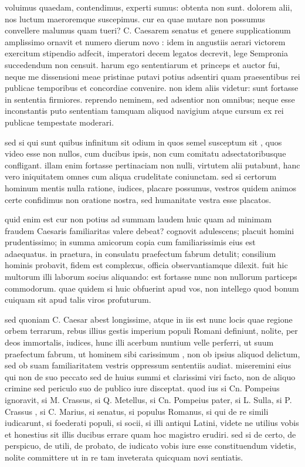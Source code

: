  voluimus quaedam, contendimus, experti sumus: obtenta non sunt. dolorem alii, nos luctum maeroremque suscepimus. cur ea quae mutare non possumus convellere malumus quam tueri? C. Caesarem senatus et genere supplicationum amplissimo ornavit et numero dierum novo : idem in angustiis aerari victorem exercitum stipendio adfecit, imperatori decem legatos decrevit, lege Sempronia succedendum non censuit. harum ego sententiarum et princeps et auctor fui, neque me dissensioni meae pristinae putavi potius adsentiri quam praesentibus rei publicae temporibus et concordiae convenire. non idem aliis videtur: sunt fortasse in sententia firmiores. reprendo neminem, sed adsentior non omnibus; neque esse inconstantis puto sententiam tamquam aliquod navigium atque cursum ex rei publicae tempestate moderari.

 sed si qui sunt quibus infinitum sit odium in quos semel susceptum sit , quos video esse non nullos, cum ducibus ipsis, non cum comitatu adsectatoribusque confligant. illam enim fortasse pertinaciam non nulli, virtutem alii putabunt, hanc vero iniquitatem omnes cum aliqua crudelitate coniunctam. sed si certorum hominum mentis nulla ratione, iudices, placare possumus, vestros quidem animos certe confidimus non oratione nostra, sed humanitate vestra esse placatos.

 quid enim est cur non potius ad summam laudem huic quam ad minimam fraudem Caesaris familiaritas valere debeat? cognovit adulescens; placuit homini prudentissimo; in summa amicorum copia cum familiarissimis eius est adaequatus. in praetura, in consulatu praefectum fabrum detulit; consilium hominis probavit, fidem est complexus, officia observantiamque dilexit. fuit hic multorum illi laborum socius aliquando: est fortasse nunc non nullorum particeps commodorum. quae quidem si huic obfuerint apud vos, non intellego quod bonum cuiquam sit apud talis viros profuturum.

 sed quoniam C. Caesar abest longissime, atque in iis est nunc locis quae regione orbem terrarum, rebus illius gestis imperium populi Romani definiunt, nolite, per deos immortalis, iudices, hunc illi acerbum nuntium velle perferri, ut suum praefectum fabrum, ut hominem sibi carissimum , non ob ipsius aliquod delictum, sed ob suam familiaritatem vestris oppressum sententiis audiat. miseremini eius qui non de suo peccato sed de huius summi et clarissimi viri facto, non de aliquo crimine sed periculo suo de publico iure disceptat. quod ius si Cn. Pompeius ignoravit, si M. Crassus, si Q. Metellus, si Cn. Pompeius pater, si L. Sulla, si P. Crassus , si C. Marius, si senatus, si populus Romanus, si qui de re simili iudicarunt, si foederati populi, si socii, si illi antiqui Latini, videte ne utilius vobis et honestius sit illis ducibus errare quam hoc magistro erudiri. sed si de certo, de perspicuo, de utili, de probato, de iudicato vobis iure esse constituendum videtis, nolite committere ut in re tam inveterata quicquam novi sentiatis.

